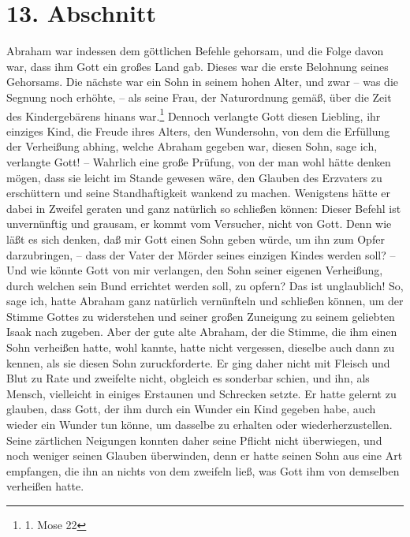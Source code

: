 \section{13. Abschnitt} \label{kap4_ab13}

Abraham  war indessen dem göttlichen Befehle gehorsam,
und die Folge davon war,
dass ihm Gott ein großes Land gab. Dieses war die erste Belohnung seines
Gehorsams. Die nächste war ein Sohn in seinem hohen Alter, und zwar -- was die
Segnung noch erhöhte, -- als seine Frau, der Naturordnung gemäß, über die Zeit
des Kindergebärens hinans war.\footnote{1. Mose 22}
Dennoch verlangte Gott diesen
Liebling, ihr einziges Kind, die Freude ihres Alters, den Wundersohn, von dem
die Erfüllung der Verheißung abhing, welche Abraham gegeben war, diesen Sohn,
sage ich, verlangte Gott! -- Wahrlich eine große Prüfung, von der man wohl hätte
denken mögen, dass sie leicht im Stande gewesen wäre, den Glauben des Erzvaters
zu erschüttern und seine Standhaftigkeit wankend zu machen. Wenigstens hätte er
dabei in Zweifel geraten und ganz natürlich so schließen können: Dieser Befehl
ist unvernünftig und grausam, er kommt vom Versucher, nicht von Gott. Denn wie
läßt es sich denken, daß mir Gott einen Sohn geben würde, um ihn zum Opfer
darzubringen, -- dass der Vater der Mörder seines einzigen Kindes werden soll?
-- Und wie könnte Gott von mir verlangen, den Sohn seiner eigenen Verheißung,
durch welchen sein Bund errichtet werden soll, zu opfern? Das ist unglaublich!
So, sage ich, hatte Abraham ganz natürlich vernünfteln und schließen können, um
der Stimme Gottes zu widerstehen und seiner großen Zuneigung zu seinem geliebten
Isaak  nach zugeben. Aber der gute alte Abraham, der die
Stimme, die ihm einen
Sohn verheißen hatte, wohl kannte, hatte nicht vergessen, dieselbe auch dann zu
kennen, als sie diesen Sohn zuruckforderte. Er ging daher nicht mit Fleisch und
Blut zu Rate und zweifelte nicht, obgleich es sonderbar schien, und ihn, als
Mensch, vielleicht in einiges Erstaunen und Schrecken setzte. Er hatte gelernt
zu glauben, dass Gott, der ihm durch ein Wunder ein Kind gegeben habe, auch
wieder ein Wunder tun könne, um dasselbe zu erhalten oder wiederherzustellen.
Seine zärtlichen Neigungen konnten daher seine Pflicht nicht überwiegen, und
noch weniger seinen Glauben überwinden, denn er hatte seinen Sohn aus eine Art
empfangen, die ihn an nichts von dem zweifeln ließ, was Gott ihm von demselben
verheißen hatte.

\medskip

